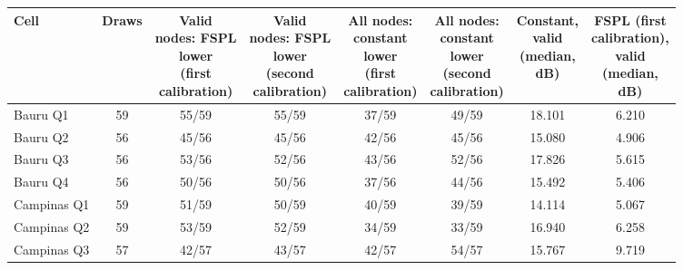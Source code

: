 \begin{tabular}{lccccccc}
\toprule
Cell & Draws & \celula{Valid \\ \relax nodes: FSPL \\ \relax lower \\ \relax (first \\ \relax calibration)} & \celula{Valid \\ \relax nodes: FSPL \\ \relax lower \\ \relax (second \\ \relax calibration)} & \celula{All nodes: \\ \relax constant \\ \relax lower \\ \relax (first \\ \relax calibration)} & \celula{All nodes: \\ \relax constant \\ \relax lower \\ \relax (second \\ \relax calibration)} & \celula{Constant, \\ \relax valid \\ \relax (median, \\ \relax dB)} & \celula{FSPL (first \\ \relax calibration), \\ \relax valid \\ \relax (median, \\ \relax dB)} \\
\midrule
Bauru Q1 & 59 & 55/59 & 55/59 & 37/59 & 49/59 & 18.101 & 6.210 \\
Bauru Q2 & 56 & 45/56 & 45/56 & 42/56 & 45/56 & 15.080 & 4.906 \\
Bauru Q3 & 56 & 53/56 & 52/56 & 43/56 & 52/56 & 17.826 & 5.615 \\
Bauru Q4 & 56 & 50/56 & 50/56 & 37/56 & 44/56 & 15.492 & 5.406 \\
Campinas Q1 & 59 & 51/59 & 50/59 & 40/59 & 39/59 & 14.114 & 5.067 \\
Campinas Q2 & 59 & 53/59 & 52/59 & 34/59 & 33/59 & 16.940 & 6.258 \\
Campinas Q3 & 57 & 42/57 & 43/57 & 42/57 & 54/57 & 15.767 & 9.719 \\

\end{tabular}
